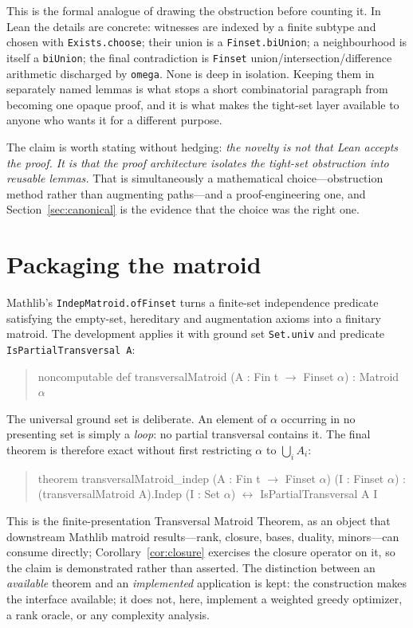 \documentclass[11pt]{article}
\newcommand{\lean}[1]{\texttt{#1}}
\begin{document}
This is the formal analogue of drawing the obstruction before counting it. In Lean the details are
concrete: witnesses are indexed by a finite subtype and chosen with \lean{Exists.choose};
their union is a \lean{Finset.biUnion}; a neighbourhood is itself a \lean{biUnion}; the final
contradiction is \lean{Finset} union/intersection/difference arithmetic discharged by
\lean{omega}. None is deep in isolation. Keeping them in separately named lemmas is what stops a
short combinatorial paragraph from becoming one opaque proof, and it is what makes the tight-set
layer available to anyone who wants it for a different purpose.

The claim is worth stating without hedging: \emph{the novelty is not that Lean accepts the proof.
It is that the proof architecture isolates the tight-set obstruction into reusable lemmas.} That
is simultaneously a mathematical choice---obstruction method rather than augmenting paths---and a
proof-engineering one, and Section~\ref{sec:canonical} is the evidence that the choice was the
right one.

\section{Packaging the matroid}\label{sec:q4}

Mathlib's \lean{IndepMatroid.ofFinset} turns a finite-set independence predicate satisfying the
empty-set, hereditary and augmentation axioms into a finitary matroid. The development applies it
with ground set \lean{Set.univ} and predicate \lean{IsPartialTransversal A}:
\begin{quote}\ttfamily\small\noindent
noncomputable def transversalMatroid (A : Fin t $\to$ Finset $\alpha$) : Matroid $\alpha$
\end{quote}
The universal ground set is deliberate. An element of $\alpha$ occurring in no presenting set is
simply a \emph{loop}: no partial transversal contains it. The final theorem is therefore exact
without first restricting $\alpha$ to $\bigcup_i A_i$:
\begin{quote}\ttfamily\small\noindent
theorem transversalMatroid\_indep (A : Fin t $\to$ Finset $\alpha$) (I : Finset $\alpha$) :\\
\hspace*{1em}(transversalMatroid A).Indep (I : Set $\alpha$) $\leftrightarrow$ IsPartialTransversal A I
\end{quote}
This is the finite-presentation Transversal Matroid Theorem, as an object that downstream Mathlib
matroid results---rank, closure, bases, duality, minors---can consume directly;
Corollary~\ref{cor:closure} exercises the closure operator on it, so the claim is demonstrated
rather than asserted. The distinction
between an \emph{available} theorem and an \emph{implemented} application is kept: the
construction makes the interface available; it does not, here, implement a weighted greedy
optimizer, a rank oracle, or any complexity analysis.
\end{document}
